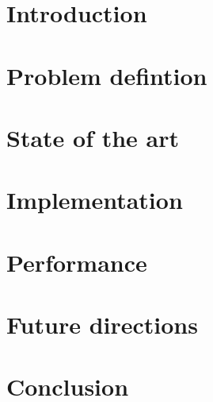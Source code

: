 






\chapter{Introduction}


\chapter{Problem defintion}


\chapter{State of the art}


\chapter{Implementation}


\chapter{Performance}


\chapter{Future directions}


\chapter{Conclusion}



 

\appendix




